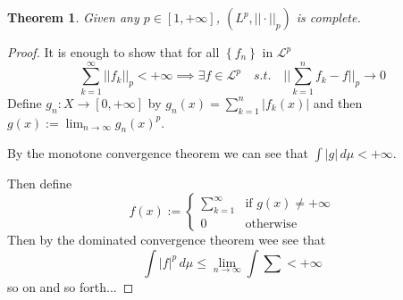 \documentclass[11pt]{article}
\newcommand{\defeq}{:=}
\newcommand{\abs}[1]{|#1|}
\newcommand{\norm}[1]{||#1||}
\newcommand{\dm}{\ensuremath{\,d\mu}}
\newtheorem{theorem}{Theorem}[section]
\begin{document}
\begin{theorem}
Given any $p\in[1, +\infty]$, $(L^p, \norm{\cdot}_p)$ is complete.
\end{theorem}

\begin{proof}
It is enough to show that for all $\left\{f_n\right\}$ in $\mathcal{L}^p$
\[
	\sum_{k=1}^{\infty}\norm{f_k}_p < +\infty \implies \exists f\in\mathcal{L}^p \quad s.t. \quad \norm{\sum_{k=1}^{n}f_k-f}_p \to 0
\]
Define $g_n:X\to [0, +\infty]$ by $g_n(x)=\sum_{k=1}^{n}\abs{f_k(x)}$ and then $g(x)\defeq \lim_{n\to\infty}g_n(x)^p$.

By the monotone convergence theorem we can see that $\int\abs{g}\dm < + \infty$.

Then define
\[
	f(x)\defeq
	\begin{cases}
		\sum_{k=1}^{\infty} & \text{if } g(x)\neq + \infty \\
		0 & \text{otherwise}
	\end{cases}
\]
Then by the dominated convergence theorem wee see that
\[
	\int\abs{f}^p \dm \leq \lim_{n\to\infty}\int\sum < +\infty
\]
so on and so forth...
\end{proof}
\end{document}
